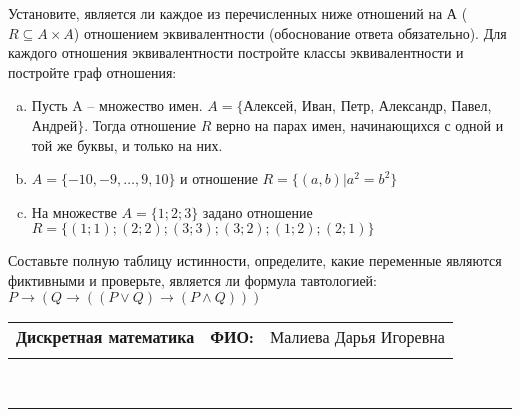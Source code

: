 \documentclass[10pt]{exam}
\newcommand{\class}{Дискретная математика}
\newcommand{\examdate}{}
\begin{document}
\begin{questions}
\question
Установите, является ли каждое из перечисленных ниже отношений на А ($R \subseteq A \times A$) отношением эквивалентности (обоснование ответа обязательно). Для каждого отношения эквивалентности постройте классы 
эквивалентности и постройте граф отношения:
\begin{enumerate} [a)]\setcounter{enumi}{0}
\item Пусть A – множество имен. $A = \{ $Алексей, Иван, Петр, Александр, Павел, Андрей$ \}$. Тогда отношение $R$ верно на парах имен, начинающихся с одной и той же буквы, и только на них.
\item $A = \{-10, -9, … , 9, 10\}$ и отношение $ R = \{(a,b)|a^{2} = b^{2}\}$
\item На множестве $A = \{1; 2; 3\}$ задано отношение $R = \{(1; 1); (2; 2); (3; 3); (3; 2); (1; 2); (2; 1)\}$
\end{enumerate}\question Составьте полную таблицу истинности, определите, какие переменные являются фиктивными и проверьте, является ли формула тавтологией:
$ P \rightarrow (Q \rightarrow ((P \lor Q) \rightarrow (P \land Q)))$

\end{questions}
\newpage
\begin{flushright}
\begin{tabular}{p{2.8in} r l}
\textbf{\class} & \textbf{ФИО:} &Малиева Дарья Игоревна
\\

\textbf{\examdate} &&\\
\end{tabular}\\
\end{flushright}
\rule[1ex]{\textwidth}{.1pt}
\end{document}
